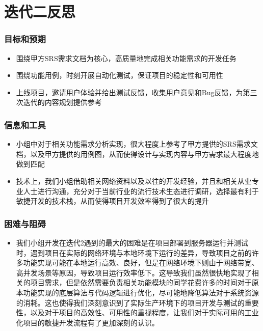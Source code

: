 \section{迭代二反思}
\begin{frame}
    \frametitle{目标和预期}
    \begin{itemize}
        \item 围绕甲方SRS需求文档为核心，高质量地完成相关功能需求的开发任务
        \item 围绕功能用例，时刻开展自动化测试，保证项目的稳定性和可用性
        \item 上线项目，邀请用户体验并给出测试反馈，收集用户意见和Bug反馈，为第三次迭代的内容规划提供参考
    \end{itemize}
\end{frame}

\begin{frame}
    \frametitle{信息和工具}
    \begin{itemize}
        \item 小组中对于相关功能需求分析实现，很大程度上参考了甲方提供的SRS需求文档，以及甲方提供的用例图，从而使得设计与实现内容与甲方需求最大程度地做到匹配
        \item 技术上，我们小组借助相关网络资料以及以往的开发经验，并且和相关从业专业人士进行沟通，充分对于当前行业的流行技术生态进行调研，选择最有利于敏捷开发的技术栈，从而使得项目开发效率得到了很大的提升
    \end{itemize}
\end{frame}

\begin{frame}
    \frametitle{困难与阻碍}
    \begin{itemize}
        \item 我们小组开发在迭代2遇到的最大的困难是在项目部署到服务器运行并测试时，遇到项目在实际的网络环境与本地环境下运行的差异，导致项目之前的许多功能实现可能在本地运行高效、良好，但是在网络环境下则由于网络带宽、高并发场景等原因，导致项目运行效率低下。这导致我们虽然很快地实现了相关的项目需求，但是依然需要负责相关功能模块的同学花费许多的时间对于原本功能实现的底层算法与代码逻辑进行优化，尽可能地降低算法对于系统资源的消耗。这也使得我们深刻意识到了实际生产环境下的项目开发与测试的重要性，以及对于项目的高效性、可用性的重视程度，让我们对于实际可用的工业化项目的敏捷开发流程有了更加深刻的认识。
    \end{itemize}
\end{frame}

